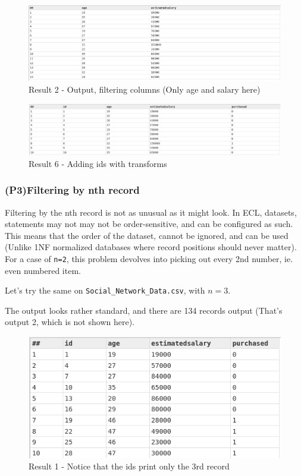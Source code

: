 \documentclass[a4paper,oneside,12pt]{book}
\begin{document}
\begin{figure}[h]
    \centering
    \includegraphics[width=\linewidth]{../output/26/2.png}
    \caption{Result 2 - Output, filtering columns (Only age and salary here)}
\end{figure}

\begin{figure}[h]
    \centering
    \includegraphics[width=\linewidth]{../output/26/6withid.png}
    \caption{Result 6 - Adding ids with transforms}
\end{figure}


\subsubsection[Filtering \textit{n}\textsuperscript{th} record]{(P3)Filtering by nth record}

Filtering by the nth record is not as unusual as it might look. In ECL, datasets, statements may not may not be order-sensitive, and can be configured as such. This means that the order of the dataset, cannot be ignored, and can be used (Unlike 1NF normalized databases where record positions should never matter).
For a case of \lstinline!n=2!, this problem devolves into picking out every 2nd number, ie. even numbered item.

Let's try the same on \lstinline!Social_Network_Data.csv!, with $n=3$.




The output looks rather standard, and there are 134 records output (That's output 2, which is not shown here).

\begin{figure}[h]
    \centering
    \includegraphics[width=.8\linewidth]{../output/27/1filt_op}
    \caption{Result 1 - Notice that the ids print only the 3rd record}
\end{figure}
\pagebreak
\end{document}

